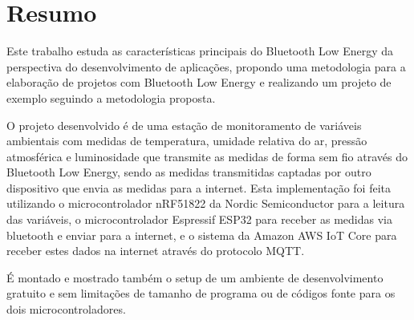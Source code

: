 \section{Resumo}

Este trabalho estuda as características principais do Bluetooth Low Energy da
perspectiva do desenvolvimento de aplicações, propondo uma metodologia para a
elaboração de projetos com Bluetooth Low Energy e realizando um projeto de
exemplo seguindo a metodologia proposta. 

O projeto desenvolvido é de uma estação de monitoramento de variáveis ambientais
com medidas de temperatura, umidade relativa do ar, pressão atmosférica e
luminosidade que transmite as medidas de forma sem fio através do Bluetooth Low
Energy, sendo as medidas transmitidas captadas por outro dispositivo que envia
as medidas para a internet. Esta implementação foi feita utilizando o 
microcontrolador nRF51822 da Nordic Semiconductor para a leitura das variáveis,
o microcontrolador Espressif ESP32 para receber as medidas via bluetooth e
enviar para a internet, e o sistema da Amazon AWS IoT Core para receber estes
dados na internet através  do protocolo MQTT. 

É montado e mostrado também o setup de um ambiente de desenvolvimento gratuito
e sem limitações de tamanho de programa ou de códigos fonte para os dois
microcontroladores.

